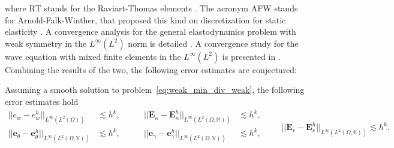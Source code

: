where $\mathrm{RT}$ stands for the Raviart-Thomas elements \cite{raviart1977}. The acronym AFW stands for Arnold-Falk-Winther, that proposed this kind on discretization for static elasticity \cite{arnold2007mixed}. A convergence analysis for the general elastodynamics problem with weak symmetry in the $L^\infty (L^2)$ norm is detailed \cite{arnold2014elastodynamics}. A convergence study for the wave equation with mixed finite elements in the $L^\infty (L^2)$ is presented in \cite{geveci1988}. Combining the results of the two, the following error estimates are conjectured:
\begin{conjecture}\label{conj:AWFestimates}
	Assuming a smooth solution to problem~\eqref{eq:weak_min_div_weak}, the following error estimates hold 
	\begin{equation}
	\label{eq:errAFW}
	\begin{aligned}
	||e_w - e_w^h||_{L^{\infty}(L^2(\Omega))} &\lesssim h^{k}, \\
	||\bm{e}_\theta - \bm{e}_\theta^h||_{L^{\infty}(L^2(\Omega, \mathbb{V}))} &\lesssim h^{k}, \\
	\end{aligned} \qquad
	\begin{aligned}
	||\bm{E}_\kappa - \bm{E}_\kappa^h||_{L^{\infty}(L^2(\Omega, \mathbb{M}))} &\lesssim  h^{k}, \\
	||\bm{e}_\gamma - \bm{e}_\gamma^ h||_{L^{\infty}(L^2(\Omega, \mathbb{V}))} &\lesssim  h^{k}, \\
	\end{aligned} \qquad
	||\bm{E}_r - \bm{E}_r^h||_{L^{\infty}(L^2(\Omega, \mathbb{K}))} \lesssim h^{k}. 
	\end{equation}
\end{conjecture}

